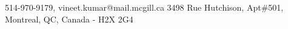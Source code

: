\documentclass{resume} %
\begin{document}
\begin{hSubsection}{514-970-9179, vineet.kumar@mail.mcgill.ca}
{%
}{3498 Rue Hutchison, Apt\#501, Montreal, QC, Canada - H2X 2G4}
\end{hSubsection}



\end{document}
